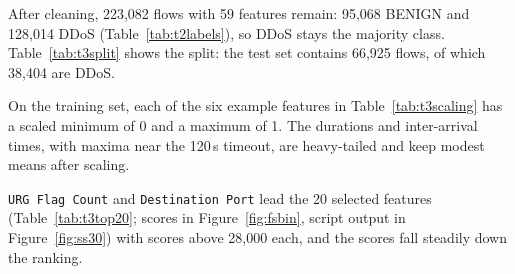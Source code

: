 
\begin{table}[ht]
	\centering\small
	
	\caption{Removed columns. For identical pairs, the first column is kept and the second one dropped.}
	\label{tab:t3removed}
\end{table}

After cleaning, 223,082 flows with 59 features remain: 95,068 BENIGN and 128,014 DDoS (Table~\ref{tab:t2labels}), so DDoS stays the majority class. Table~\ref{tab:t3split} shows the split: the test set contains 66,925 flows, of which 38,404 are DDoS.

\begin{table}[ht]
	\centering\small
	
	\caption{Stratified 70/30 split (\texttt{random\_state=42}).}
	\label{tab:t3split}
\end{table}


On the training set, each of the six example features in Table~\ref{tab:t3scaling} has a scaled minimum of 0 and a maximum of 1. The durations and inter-arrival times, with maxima near the 120\,s timeout, are heavy-tailed and keep modest means after scaling.

\begin{table}[ht]
	\centering\small
	
	\caption{Six example features of the training set before and after min-max scaling.}
	\label{tab:t3scaling}
\end{table}

\texttt{URG Flag Count} and \texttt{Destination Port} lead the 20 selected features (Table~\ref{tab:t3top20}; scores in Figure~\ref{fig:fsbin}, script output in Figure~\ref{fig:ss30}) with scores above 28,000 each, and the scores fall steadily down the ranking.

\begin{table}[ht]
	\centering\small
	
	\caption{The 20 best features by $\chi^2$ score (min-max-scaled training set), binary target.}
	\label{tab:t3top20}
\end{table}


